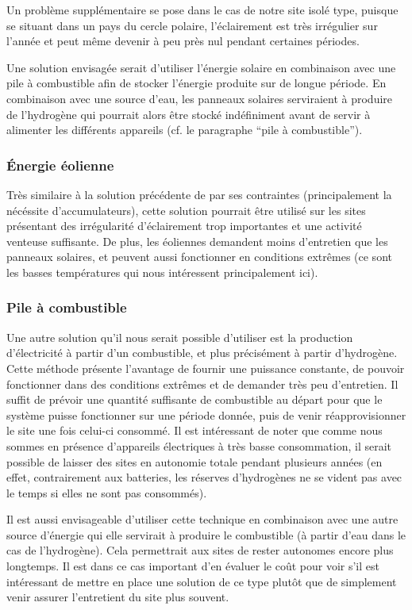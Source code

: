 Un problème supplémentaire se pose dans le cas de notre site isolé type, puisque se situant dans un pays du cercle polaire, l’éclairement est très irrégulier sur l’année et peut même devenir à peu près nul pendant certaines périodes.

Une solution envisagée serait d’utiliser l’énergie solaire en combinaison avec une pile à combustible afin de stocker l’énergie produite sur de longue période. En combinaison avec une source d’eau, les panneaux solaires serviraient à produire de l’hydrogène qui pourrait alors être stocké indéfiniment avant de servir à alimenter les différents appareils (cf. le paragraphe “pile à combustible”).

\subsubsection{Énergie éolienne}

Très similaire à la solution précédente de par ses contraintes (principalement la nécéssite d’accumulateurs), cette solution pourrait être utilisé sur les sites présentant des irrégularité d’éclairement trop importantes et une activité venteuse suffisante. De plus, les éoliennes demandent moins d’entretien que les panneaux solaires, et peuvent aussi fonctionner en conditions extrêmes (ce sont les basses températures qui nous intéressent principalement ici).

\subsubsection{Pile à combustible}

Une autre solution qu’il nous serait possible d’utiliser est la production d’électricité à partir d’un combustible, et plus précisément à partir d’hydrogène. Cette méthode présente l’avantage de fournir une puissance constante, de pouvoir fonctionner dans des conditions extrêmes et de demander très peu d’entretien. Il suffit de prévoir une quantité suffisante de combustible au départ pour que le système puisse fonctionner sur une période donnée, puis de venir réapprovisionner le site une fois celui-ci consommé. Il est intéressant de noter que comme nous sommes en présence d’appareils électriques à très basse consommation, il serait possible de laisser des sites en autonomie totale pendant plusieurs années (en effet, contrairement aux batteries, les réserves d’hydrogènes ne se vident pas avec le temps si elles ne sont pas consommés).

Il est aussi envisageable d’utiliser cette technique en combinaison avec une autre source d’énergie qui elle servirait à produire le combustible (à partir d’eau dans le cas de l’hydrogène). Cela permettrait aux sites de rester autonomes encore plus longtemps. Il est dans ce cas important d’en évaluer le coût pour voir s’il est intéressant de mettre en place une solution de ce type plutôt que de simplement venir assurer l’entretient du site plus souvent.

